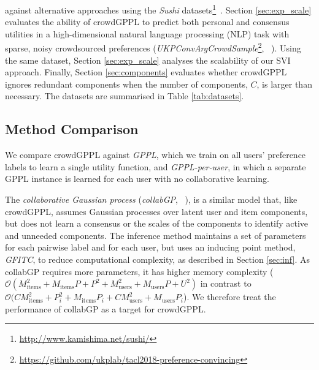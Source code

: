 against alternative approaches
using the \emph{Sushi} datasets\footnote{\url{http://www.kamishima.net/sushi/}}~\citep{kamishima2003nantonac}.
Section \ref{sec:exp_scale} evaluates 
the ability of crowdGPPL to predict both personal and consensus utilities 
in a high-dimensional
natural language processing (NLP) task
with sparse, noisy crowdsourced preferences
(\emph{UKPConvArgCrowdSample}\footnote{\url{https://github.com/ukplab/tacl2018-preference-convincing}}, ~\citet{simpson2018finding}).
Using the same dataset, Section \ref{sec:exp_scale} analyses
the scalability of our SVI approach. 
Finally, Section \ref{sec:components} evaluates whether crowdGPPL ignores redundant
components when the number of components, $C$,
is larger than necessary.
The datasets are summarised in Table \ref{tab:datasets}.

\subsection{Method Comparison}



We compare crowdGPPL against 
\emph{GPPL},
which we train on all users' preference labels to learn a single utility function,
and \emph{GPPL-per-user},
in which a separate GPPL instance is learned for each user with no collaborative
learning.

The \emph{collaborative Gaussian process} (\emph{collabGP}, ~\citet{houlsby2012collaborative}), 
is a similar model that, like crowdGPPL,
 assumes Gaussian processes over latent user and item components,
 but does not learn a consensus or the scales of the components to 
 identify active and unneeded components.
 The inference method maintains a set of parameters for each pairwise label and
 for each user, but uses an inducing point method, \emph{GFITC}, 
 to reduce computational complexity, as described in Section \ref{sec:inf}.
As collabGP requires more parameters, it has higher memory complexity 
($\mathcal{O}(M_{\mathrm{items}}^2 + M_{\mathrm{items}}P + P^2 + M_{\mathrm{users}}^2 + M_{\mathrm{users}}P +U^2)$ 
in contrast to 
$\mathcal{O}(CM_{\mathrm{items}}^2 + P_i^2 + M_{\mathrm{items}} P_i + CM_{\mathrm{users}}^2 + M_{\mathrm{users}} P_i$).
We therefore treat the performance of collabGP as a target for crowdGPPL.

